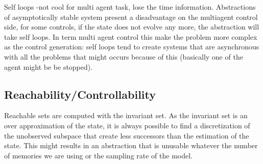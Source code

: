 Self loops -not cool for multi agent task, lose the time information.
Abstractions of asymptotically stable system present a disadvantage on the multiagent control side, for some controls, if the state does not evolve any more, the abstraction will take self loops.
In term multi agent control this make the problem more complex as the control generation: self loops tend to create systems that are asynchronous with all the problems that might occurs because of this (basically one of the agent might be be stopped).





\subsection{Reachability/Controllability}
Reachable sets are computed with the invariant set. As the invariant set is an over approximation of the state, it is always possible to find a discretization of the unobserved subspace that create less successors than the estimation of the state.
This might results in an abstraction that is unusable whatever the number of memories we are using or the sampling rate of the model.

%
%
